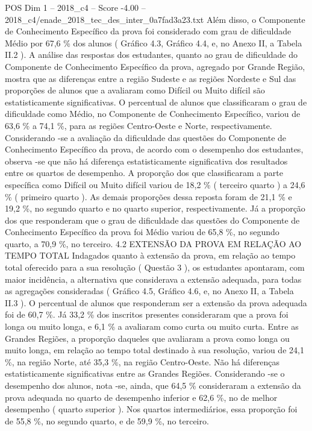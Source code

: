 \begin{textsample}{POS Dim 1 – 2018\_c4 – Score -4.00 – 2018\_c4/enade\_2018\_tec\_des\_inter\_0a7fad3a23.txt}
Além disso, o Componente de Conhecimento Específico da prova foi considerado com grau de dificuldade Médio por 67,6 \% dos alunos ( Gráfico 4.3, Gráfico 4.4, e, no Anexo II, a Tabela II.2 ).
A análise das respostas dos estudantes, quanto ao grau de dificuldade do Componente de Conhecimento Específico da prova, agregado por Grande Região, mostra que as diferenças entre a região Sudeste e as regiões Nordeste e Sul das proporções de alunos que a avaliaram como Difícil ou Muito difícil são estatisticamente significativas.
O percentual de alunos que classificaram o grau de dificuldade como Médio, no Componente de Conhecimento Específico, variou de 63,6 \% a 74,1 \%, para as regiões Centro-Oeste e Norte, respectivamente.
Considerando -se a avaliação da dificuldade das questões do Componente de Conhecimento Específico da prova, de acordo com o desempenho dos estudantes, observa -se que não há diferença estatisticamente significativa dos resultados entre os quartos de desempenho.
A proporção dos que classificaram a parte específica como Difícil ou Muito difícil variou de 18,2 \% ( terceiro quarto ) a 24,6 \% ( primeiro quarto ).
As demais proporções dessa reposta foram de 21,1 \% e 19,2 \%, no segundo quarto e no quarto superior, respectivamente.
Já a proporção dos que responderam que o grau de dificuldade das questões do Componente de Conhecimento Específico da prova foi Médio variou de 65,8 \%, no segundo quarto, a 70,9 \%, no terceiro. 4.2 EXTENSÃO DA PROVA EM RELAÇÃO AO TEMPO TOTAL Indagados quanto à extensão da prova, em relação ao tempo total oferecido para a sua resolução ( Questão 3 ), os estudantes apontaram, com maior incidência, a alternativa que considerava a extensão adequada, para todas as agregações consideradas ( Gráfico 4.5, Gráfico 4.6, e, no Anexo II, a Tabela II.3 ).
O percentual de alunos que responderam ser a extensão da prova adequada foi de 60,7 \%.
Já 33,2 \% dos inscritos presentes consideraram que a prova foi longa ou muito longa, e 6,1 \% a avaliaram como curta ou muito curta.
Entre as Grandes Regiões, a proporção daqueles que avaliaram a prova como longa ou muito longa, em relação ao tempo total destinado à sua resolução, variou de 24,1 \%, na região Norte, até 35,3 \%, na região Centro-Oeste.
Não há diferenças estatisticamente significativas entre as Grandes Regiões.
Considerando -se o desempenho dos alunos, nota -se, ainda, que 64,5 \% consideraram a extensão da prova adequada no quarto de desempenho inferior e 62,6 \%, no de melhor desempenho ( quarto superior ).
Nos quartos intermediários, essa proporção foi de 55,8 \%, no segundo quarto, e de 59,9 \%, no terceiro.

\end{textsample}
